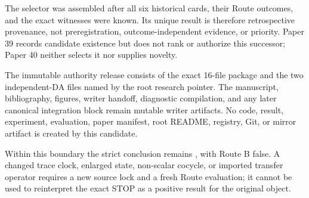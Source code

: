 The selector was assembled after all six historical cards, their Route
outcomes, and the exact witnesses were known.  Its unique result is therefore
retrospective provenance, not preregistration, outcome-independent evidence,
or priority.  Paper 39 records candidate existence but does not rank or
authorize this successor; Paper 40 neither selects it nor supplies novelty.

The immutable authority release consists of the exact 16-file
 package and the two independent-DA files named by the
root research pointer.  The manuscript, bibliography, figures, writer
handoff, diagnostic compilation, and any later canonical integration block
remain mutable writer artifacts.  No code, result, experiment, evaluation,
paper manifest, root README, registry, Git, or mirror artifact is created by
this candidate.

Within this boundary the strict conclusion remains
, with Route B false.  A changed trace clock,
enlarged state, non-scalar cocycle, or imported transfer operator requires a
new source lock and a fresh Route evaluation; it cannot be used to reinterpret
the exact STOP as a positive result for the original object.
